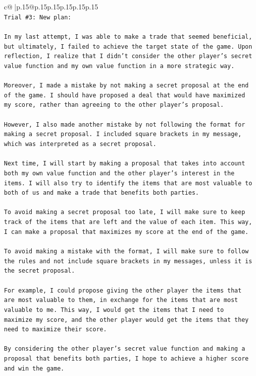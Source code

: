 \documentclass{article}
\begin{document}
{\begin{supertabular}{c@{$\;$}|p{.15\linewidth}@{}p{.15\linewidth}p{.15\linewidth}p{.15\linewidth}p{.15\linewidth}p{.15\linewidth}}
{{{\\ 
\texttt{Trial \#3: New plan: } \\
\\ 
\texttt{In my last attempt, I was able to make a trade that seemed beneficial, but ultimately, I failed to achieve the target state of the game. Upon reflection, I realize that I didn't consider the other player's secret value function and my own value function in a more strategic way. } \\
\\ 
\texttt{Moreover, I made a mistake by not making a secret proposal at the end of the game. I should have proposed a deal that would have maximized my score, rather than agreeing to the other player's proposal. } \\
\\ 
\texttt{However, I also made another mistake by not following the format for making a secret proposal. I included square brackets in my message, which was interpreted as a secret proposal. } \\
\\ 
\texttt{Next time, I will start by making a proposal that takes into account both my own value function and the other player's interest in the items. I will also try to identify the items that are most valuable to both of us and make a trade that benefits both parties. } \\
\\ 
\texttt{To avoid making a secret proposal too late, I will make sure to keep track of the items that are left and the value of each item. This way, I can make a proposal that maximizes my score at the end of the game. } \\
\\ 
\texttt{To avoid making a mistake with the format, I will make sure to follow the rules and not include square brackets in my messages, unless it is the secret proposal. } \\
\\ 
\texttt{For example, I could propose giving the other player the items that are most valuable to them, in exchange for the items that are most valuable to me. This way, I would get the items that I need to maximize my score, and the other player would get the items that they need to maximize their score. } \\
\\ 
\texttt{By considering the other player's secret value function and making a proposal that benefits both parties, I hope to achieve a higher score and win the game.} \\
}}}
\end{supertabular}}
\end{document}
